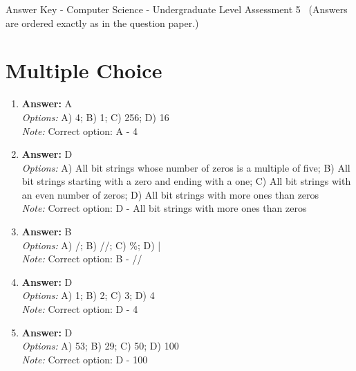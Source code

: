 \documentclass[12pt]{article}
\begin{document}
\begin{center}
Answer Key - Computer Science - Undergraduate Level Assessment 5 \
\small (Answers are ordered exactly as in the question paper.)
\end{center}

\section*{Multiple Choice}
\begin{enumerate}[label=\arabic*.]
\item \textbf{Answer:} A
\\ \textit{Options:} A) 4; B) 1; C) 256; D) 16
\\ \textit{Note:} Correct option: A - 4
\item \textbf{Answer:} D
\\ \textit{Options:} A) All bit strings whose number of zeros is a multiple of five; B) All bit strings starting with a zero and ending with a one; C) All bit strings with an even number of zeros; D) All bit strings with more ones than zeros
\\ \textit{Note:} Correct option: D - All bit strings with more ones than zeros
\item \textbf{Answer:} B
\\ \textit{Options:} A) /; B) //; C) \%; D) |
\\ \textit{Note:} Correct option: B - //
\item \textbf{Answer:} D
\\ \textit{Options:} A) 1; B) 2; C) 3; D) 4
\\ \textit{Note:} Correct option: D - 4
\item \textbf{Answer:} D
\\ \textit{Options:} A) 53; B) 29; C) 50; D) 100
\\ \textit{Note:} Correct option: D - 100
\end{enumerate}
\end{document}

